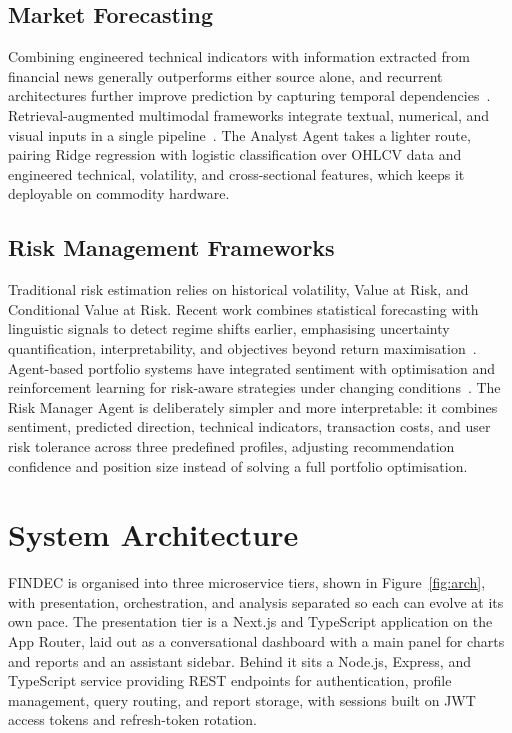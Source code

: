 \documentclass[conference]{IEEEtran}
\begin{document}
\subsection{Market Forecasting}

Combining engineered technical indicators with information extracted from financial news generally outperforms either source alone, and recurrent architectures further improve prediction by capturing temporal dependencies~\cite{gagneja2026lstm}. Retrieval-augmented multimodal frameworks integrate textual, numerical, and visual inputs in a single pipeline~\cite{jiang2025multimodal}. The Analyst Agent takes a lighter route, pairing Ridge regression with logistic classification over OHLCV data and engineered technical, volatility, and cross-sectional features, which keeps it deployable on commodity hardware.

\subsection{Risk Management Frameworks}

Traditional risk estimation relies on historical volatility, Value at Risk, and Conditional Value at Risk. Recent work combines statistical forecasting with linguistic signals to detect regime shifts earlier, emphasising uncertainty quantification, interpretability, and objectives beyond return maximisation~\cite{chen2026smart}. Agent-based portfolio systems have integrated sentiment with optimisation and reinforcement learning for risk-aware strategies under changing conditions~\cite{mantshimuli2026toward}. The Risk Manager Agent is deliberately simpler and more interpretable: it combines sentiment, predicted direction, technical indicators, transaction costs, and user risk tolerance across three predefined profiles, adjusting recommendation confidence and position size instead of solving a full portfolio optimisation.

\section{System Architecture}
\label{sec:arch}

FINDEC is organised into three microservice tiers, shown in Figure~\ref{fig:arch}, with presentation, orchestration, and analysis separated so each can evolve at its own pace. The presentation tier is a Next.js and TypeScript application on the App Router, laid out as a conversational dashboard with a main panel for charts and reports and an assistant sidebar. Behind it sits a Node.js, Express, and TypeScript service providing REST endpoints for authentication, profile management, query routing, and report storage, with sessions built on JWT access tokens and refresh-token rotation.
\end{document}
